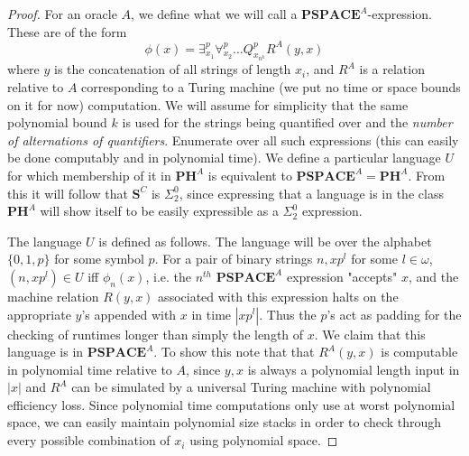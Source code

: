 \begin{proof}
	For an oracle $A$, we define what we will call a $\bm{PSPACE}^A$-expression. These are of the form 
	\[ \phi(x) = \exists^p_{x_1} \forall^p_{x_2} \ldots Q^p_{x_{n^k}} R^A(y,x) \]
	where $y$ is the concatenation of all strings of length $x_i$, and $R^A$ is a relation relative to $A$ corresponding to a Turing machine (we put no time or space bounds on it for now) computation. We will assume for simplicity that the same polynomial bound $k$ is used for the strings being quantified over and the \emph{number of alternations of quantifiers}. Enumerate over all such expressions (this can easily be done computably and in polynomial time). We define a particular language $U$ for which membership of it in $\bm{PH}^A$ is equivalent to $\bm{PSPACE}^A = \bm{PH}^A$. From this it will follow that $\bm{S}^C$ is $\Sigma^0_2$, since expressing that a language is in the class $\bm{PH}^A$ will show itself to be easily expressible as a $\Sigma^0_2$ expression. \par 
	The language $U$ is defined as follows. The language will be over the alphabet $\{0,1,p\}$ for some symbol $p$. For a pair of binary strings $n,xp^l$ for some $l \in \omega$, $(n,xp^l) \in U$ iff $\phi_n(x)$, i.e. the $n^{th}$ $\bm{PSPACE}^A$ expression "accepts" $x$, and the machine relation $R(y,x)$ associated with this expression halts on the appropriate $y$'s appended with $x$ in time $|xp^l|$. Thus the $p$'s act as padding for the checking of runtimes longer than simply the length of $x$. We claim that this language is in $\bm{PSPACE}^A$. To show this note that that $R^A(y,x)$ is computable in polynomial time relative to $A$, since $y,x$ is always a polynomial length input in $|x|$ and $R^A$ can be simulated by a universal Turing machine with polynomial efficiency loss. Since polynomial time computations only use at worst polynomial space, we can easily maintain polynomial size stacks in order to check through every possible combination of $x_i$ using polynomial space. \par 

\end{proof}
